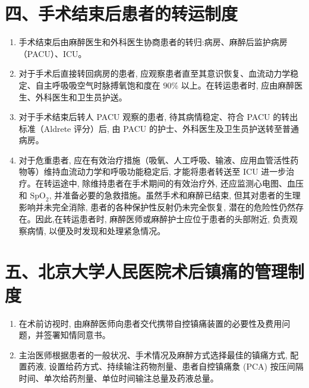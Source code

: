 \documentclass[10pt]{article}
\begin{document}
\section*{四、手术结束后患者的转运制度}
\begin{enumerate}
  \item 手术结束后由麻醉医生和外科医生协商患者的转归:病房、麻醉后监护病房（PACU）、ICU。

  \item 对于手术后直接转回病房的患者, 应观察患者直至其意识恢复、血流动力学稳定、自主呼吸吸空气时脉搏氧饱和度在 $90 \%$ 以上。在转运患者时, 应由麻醉医生、外科医生和卫生员护送。

  \item 对于手术结束后转人 PACU 观察的患者, 待其病情稳定、符合 PACU 的转出标准（Aldrete 评分）后, 由 PACU 的护士、外科医生及卫生员护送转至普通病房。

  \item 对于危重患者, 应在有效治疗措施（吸氧、人工呼吸、输液、应用血管活性药物等）维持血流动力学和呼吸功能稳定后, 才能将患者转送至 ICU 进一步治疗。在转运途中, 除维持患者在手术期间的有效治疗外, 还应监测心电图、血压和 $\mathrm{SpO}_{2}$, 并准备必要的急救措施。虽然手术和麻醉已结束, 但其对患者的生理影响并未完全消除, 患者的各种保护性反射仍未完全恢复, 潜在的危险性仍然存在。因此,在转运患者时, 麻醉医师或麻醉护士应位于患者的头部附近, 负责观察病情, 以便及时发现和处理紧急情况。

\end{enumerate}

\section*{五、北京大学人民医院术后镇痛的管理制度}
\begin{enumerate}
  \item 在术前访视时, 由麻醉医师向患者交代携带自控镇痛装置的必要性及费用问题，并签署知情同意书。

  \item 主治医师根据患者的一般状况、手术情况及麻醉方式选择最佳的镇痛方式, 配置药液, 设置给药方式、持续输注药物剂量、患者自控镇痛洜 (PCA) 按压间隔时间、单次给药剂量、单位时间输注总量及药液总量。

\end{enumerate}
\end{document}
